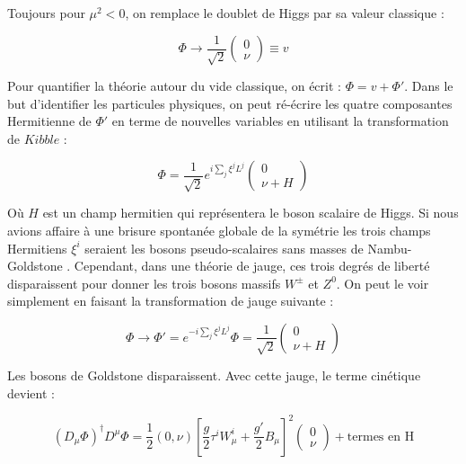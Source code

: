   Toujours pour $\mu^2<0$, on remplace le doublet de Higgs par sa valeur classique :
  
  \begin{equation}
   \Phi \rightarrow \dfrac{1}{\sqrt{2}} \begin{pmatrix} 0 \\ \nu \end{pmatrix} \equiv v
  \end{equation}

  Pour quantifier la th\'eorie autour du vide classique, on \'ecrit : $\Phi = v + \Phi'$. Dans le but d'identifier les particules physiques, on peut r\'e-\'ecrire les quatre composantes Hermitienne de $\Phi'$ en terme de nouvelles variables en utilisant la transformation de $Kibble$ \cite{Kibble:1967sv} :
  
  \begin{equation}
   \Phi = \dfrac{1}{\sqrt{2}} e^{i \sum_j \xi^jL^j} \begin{pmatrix} 0 \\ \nu + H \end{pmatrix}
  \end{equation}

  O\`u $H$ est un champ hermitien qui repr\'esentera le boson scalaire de Higgs. Si nous avions affaire \`a une brisure spontan\'ee globale de la sym\'etrie les trois champs Hermitiens $\xi^i$ seraient les bosons pseudo-scalaires sans masses de Nambu-Goldstone \cite{Nambu:1960xd, Nambu:1961tp, Goldstone:1961eq, Goldstone:1962es}. Cependant, dans une th\'eorie de jauge, ces trois degr\'es de libert\'e disparaissent pour donner les trois bosons massifs $W^\pm$ et $Z^0$. On peut le voir simplement en faisant la transformation de jauge suivante : 
  
  \begin{equation}
   \Phi \rightarrow \Phi' = e^{- i \sum_j \xi^j L^j} \Phi = \dfrac{1}{\sqrt{2}} \begin{pmatrix} 0 \\ \nu + H \end{pmatrix}
  \end{equation}
  
  Les bosons de Goldstone disparaissent. Avec cette jauge, le terme cin\'etique devient :

  \begin{equation}
   ( D_{\mu} \Phi )^\dagger D^{\mu} \Phi = \dfrac{1}{2} (0, \nu) \left[ \dfrac{g}{2} \tau^i W^i_{\mu} + \dfrac{g'}{2} B_{\mu} \right]^2 \begin{pmatrix} 0 \\ \nu \end{pmatrix} + \text{termes en H}
  \end{equation}

